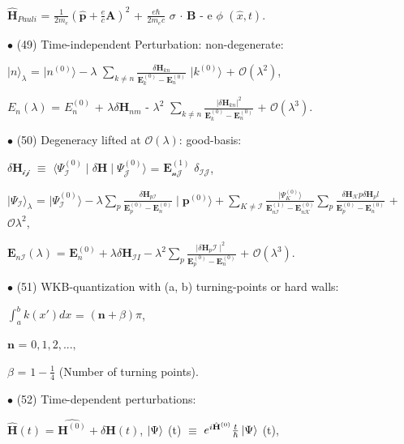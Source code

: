 \documentclass[a4paper, 10pt, onepage]{elegantbook}
\begin{document}
{$\hat{\mathbf H}_{Pauli}$ = $ \frac{1}{2m_e} (\hat{\mathbf p} + \frac{e}{c} \mathbf A)^2$ + $\frac{e \hbar}{2m_e c}$ 
$\sigma$ $\cdot$ $\mathbf B$ - e $\phi$ $(\hat x,t)$. 

$\bullet$ (49) Time-independent Perturbation:  non-degenerate:  

$\mid n \rangle_\lambda$ = $\mid n^{(0)} \rangle - \lambda$ $\sum_{k \neq n} \frac{\delta \mathbf H_{kn}} {\mathbf 
E^{(0)}_k - \mathbf E^{(0)}_n}$ $\mid k^{(0)} \rangle$ + $\mathcal O (\lambda^2)$,  

$E_n (\lambda)$ = $ E^{(0)}_n$ + $ \lambda \delta \mathbf H_{nm}$ - $\lambda^2$ $\sum_{k \neq n} \frac{ | \delta 
\mathbf H_{kn} |^2} {\mathbf E^{(0)}_k - \mathbf E^{(0)}_n}$ + $\mathcal O (\lambda^3)$. 

 $\bullet$ (50) Degeneracy lifted at $\mathcal O (\lambda)$: good-basis: 

$\delta \mathbf H_{\mathcal {ij}}$ $\equiv$ $\langle \Psi^{(0)}_\mathcal I \mid \delta \mathbf H \mid 
\Psi^{(0)}_\mathcal J \rangle$ = $\mathbf E^{(1)}_\mathcal {nJ}$ $\delta_\mathcal {IJ}$,  

$\mid \Psi_\mathcal I \rangle_\lambda$ = $\mid \Psi^{(0)}_{\mathcal I} \rangle - \lambda \sum_p \frac{\delta \mathbf 
H_{p \mathcal I}} {\mathbf E^{(0)}_p - \mathbf E^{(0)}_n} \mid \mathbf p^{(0)} \rangle + \sum_{K \neq \mathcal I} 
\frac{ \mid \Psi^{(0)}_K \rangle} {\mathbf E^{(1)}_{n \mathcal I} - \mathbf E^{(0)}_{n \mathcal K}} \sum_p \frac{ 
\delta \mathbf H_\mathcal K p \delta \mathbf H_pl} {\mathbf E^(0)_p - \mathbf E^(0)_n}$ + $\mathcal O \lambda^2$,  

$\mathbf E_{n \mathcal I} (\lambda)$ = $\mathbf E^{(0)}_n + \lambda \delta \mathbf H_{\mathcal II} -\lambda^2 \sum_p 
\frac{ \mid \delta \mathbf H_p \mathcal I \mid^2}{\mathbf E^{(0)}_p - \mathbf E^{(0)}_n}$ + $\mathcal O (\lambda^3)$. 

$\bullet$ (51) WKB-quantization with (a, b) turning-points or hard walls: 
 

$\int_a^b k(x') dx$ = $(\mathbf n + \beta) \pi$,  

$\mathbf n$ = $0,1,2,...,$  

$\beta$ = $1 - \frac{1}{4}$ (Number of turning points). 

$\bullet$ (52) Time-dependent perturbations:

$\hat{\mathbf H} (t)$ = $\hat{\mathbf H^{(0)}} + \delta \mathbf H (t)$, $ \ket \Psi$ (t) $\equiv$ $e^{i 
\hat{\mathbf H}^{(0)}} \frac{t}{\hbar}  \ket \Psi$ (t),  

}
\end{document}
